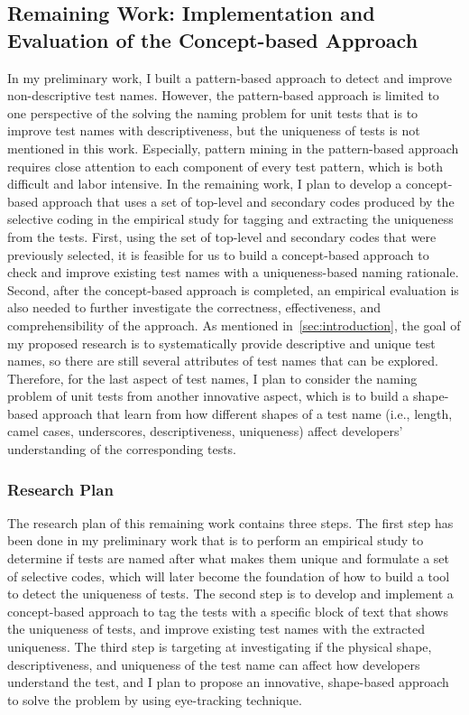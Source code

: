 \subsection{Remaining Work: Implementation and Evaluation of the Concept-based Approach}
\label{sec:remaining-work}

In my preliminary work, I built a pattern-based approach to detect and improve non-descriptive test names.
%
However, the pattern-based approach is limited to one perspective of the solving the naming problem for unit tests that is to improve test names with descriptiveness, but the uniqueness of tests is not mentioned in this work.
%
Especially, pattern mining in the pattern-based approach requires close attention to each component of every test pattern, which is both difficult and labor intensive.
%
In the remaining work, I plan to develop a concept-based approach that uses a set of top-level and secondary codes produced by the selective coding in the empirical study for tagging and extracting the uniqueness from the tests.
%
First, using the set of top-level and secondary codes that were previously selected, it is feasible for us to build a concept-based approach to check and improve existing test names with a uniqueness-based naming rationale.
%
Second, after the concept-based approach is completed, an empirical evaluation is also needed to further investigate the correctness, effectiveness, and comprehensibility of the approach.
%
As mentioned in~\cref{sec:introduction}, the goal of my proposed research is to systematically provide descriptive and unique test names, so there are still several attributes of test names that can be explored.
%
Therefore, for the last aspect of test names, I plan to consider the naming problem of unit tests from another innovative aspect, which is to build a shape-based approach that learn from how different shapes of a test name (i.e., length, camel cases, underscores, descriptiveness, uniqueness) affect developers' understanding of the corresponding tests.


\subsubsection{Research Plan}

The research plan of this remaining work contains three steps.
%
The first step has been done in my preliminary work that is to perform an empirical study to determine if tests are named after what makes them unique and formulate a set of selective codes, which will later become the foundation of how to build a tool to detect the uniqueness of tests.
%
The second step is to develop and implement a concept-based approach to tag the tests with a specific block of text that shows the uniqueness of tests, and improve existing test names with the extracted uniqueness.
%
The third step is targeting at investigating if the physical shape, descriptiveness, and uniqueness of the test name can affect how developers understand the test, and I plan to propose an innovative, shape-based approach to solve the problem by using eye-tracking technique.

